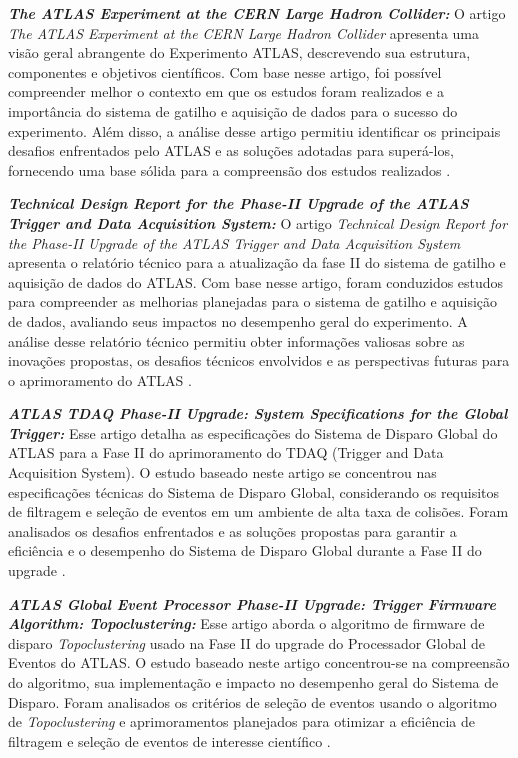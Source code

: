 \textit{\textbf{The ATLAS Experiment at the CERN Large Hadron Collider:}} O artigo \textit{The ATLAS Experiment at the CERN Large Hadron Collider} apresenta uma visão geral abrangente do Experimento ATLAS, descrevendo sua estrutura, componentes e objetivos científicos. Com base nesse artigo, foi possível compreender melhor o contexto em que os estudos foram realizados e a importância do sistema de gatilho e aquisição de dados para o sucesso do experimento. Além disso, a análise desse artigo permitiu identificar os principais desafios enfrentados pelo ATLAS e as soluções adotadas para superá-los, fornecendo uma base sólida para a compreensão dos estudos realizados \cite{The_ATLAS_Collaboration_2008}.

\textit{\textbf{Technical Design Report for the Phase-II Upgrade of the ATLAS Trigger  and Data Acquisition System:}} O artigo \textit{Technical Design Report for the Phase-II Upgrade of the ATLAS Trigger and Data Acquisition System} apresenta o relatório técnico para a atualização da fase II do sistema de gatilho e aquisição de dados do ATLAS. Com base nesse artigo, foram conduzidos estudos para compreender as melhorias planejadas para o sistema de gatilho e aquisição de dados, avaliando seus impactos no desempenho geral do experimento. A análise desse relatório técnico permitiu obter informações valiosas sobre as inovações propostas, os desafios técnicos envolvidos e as perspectivas futuras para o aprimoramento do ATLAS \cite{CERN_LHCC_2017}.

\textit{\textbf{ATLAS TDAQ Phase-II Upgrade: System Specifications for the Global Trigger:}} Esse artigo detalha as especificações do Sistema de Disparo Global do ATLAS para a Fase II do aprimoramento do TDAQ (Trigger and Data Acquisition System). O estudo baseado neste artigo se concentrou nas especificações técnicas do Sistema de Disparo Global, considerando os requisitos de filtragem e seleção de eventos em um ambiente de alta taxa de colisões. Foram analisados os desafios enfrentados e as soluções propostas para garantir a eficiência e o desempenho do Sistema de Disparo Global durante a Fase II do upgrade \cite{CERN_LHC_2022}.

\textit{\textbf{ATLAS Global Event Processor Phase-II Upgrade: Trigger Firmware Algorithm: Topoclustering:}} Esse artigo aborda o algoritmo de firmware de disparo \textit{Topoclustering} usado na Fase II do upgrade do Processador Global de Eventos do ATLAS. O estudo baseado neste artigo concentrou-se na compreensão do algoritmo, sua implementação e impacto no desempenho geral do Sistema de Disparo. Foram analisados os critérios de seleção de eventos usando o algoritmo de \textit{Topoclustering} e aprimoramentos planejados para otimizar a eficiência de filtragem e seleção de eventos de interesse científico \cite{CERN_LHC_2023}.

